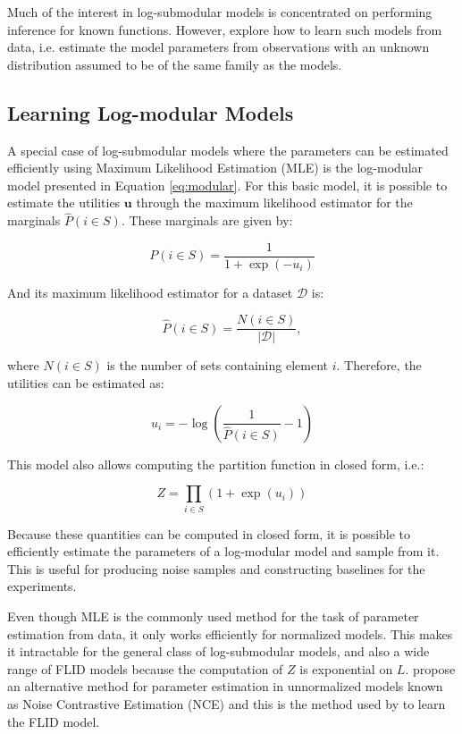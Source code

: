Much of the interest in log-submodular models is concentrated on performing inference for known functions. However, \citet{tschiatschek16learning} explore how to learn such models from data, i.e. estimate the model parameters from observations with an unknown distribution assumed to be of the same family as the models.

\subsection{Learning Log-modular Models}
\label{sec:learning_modular}

A special case of log-submodular models where the parameters can be estimated efficiently using Maximum Likelihood Estimation (MLE) is the log-modular model presented in Equation \eqref{eq:modular}. For this basic model, it is possible to estimate the utilities $\mathbf{u}$ through the maximum likelihood estimator for the marginals $\hat{P}(i \in S)$. These marginals are given by:

\begin{equation}
P(i \in S) = \frac{1}{1 + \exp(-u_{i})}
\end{equation}

And its maximum likelihood estimator for a dataset $\mathcal{D}$ is:

\begin{equation}
\hat{P}(i \in S) = \frac{N(i \in S)}{|\mathcal{D}|},
\end{equation}

where $N(i \in S)$ is the number of sets containing element $i$. Therefore, the utilities can be estimated as:

\begin{equation}
\label{eq:modular-mle}
u_{i} = -\log{\left(\frac{1}{\hat{P}(i \in S)} - 1\right)}
\end{equation}

This model also allows computing the partition function in closed form, i.e.:

\begin{equation}
\label{eq:modular-z}
Z = \prod_{i \in S}(1 + \exp(u_{i}))
\end{equation}

Because these quantities can be computed in closed form, it is possible to efficiently estimate the parameters of a log-modular model and sample from it. This is useful for producing noise samples and constructing baselines for the experiments.

Even though MLE is the commonly used method for the task of parameter estimation from data, it only works efficiently for normalized models. This makes it intractable for the general class of log-submodular models, and also a wide range of FLID models because the computation of $Z$ is exponential on $L$. \citet{Gutmann12NCE} propose an alternative method for parameter estimation in unnormalized models known as Noise Contrastive Estimation (NCE) and this is the method used by \citet{tschiatschek16learning} to learn the FLID model.

